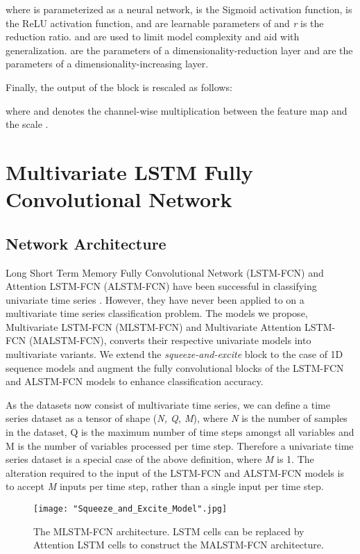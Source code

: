 \documentclass[preprint,12pt,3p]{elsarticle}
\begin{document}
where  is parameterized as a neural network,  is the Sigmoid activation function,  is the ReLU activation function,  and  are learnable parameters of  and \textit{r} is the reduction ratio.  and   are used to limit model complexity and aid with generalization.  are the parameters of a dimensionality-reduction layer and  are the parameters of a dimensionality-increasing layer. 

Finally, the output of the block is rescaled as follows:

where  and  denotes the channel-wise multiplication between the feature map  and the scale .



 
\section{Multivariate LSTM Fully Convolutional Network}
\label{LSTMFCN}
\subsection{Network Architecture}

Long Short Term Memory Fully Convolutional Network (LSTM-FCN) and Attention LSTM-FCN (ALSTM-FCN) have been successful in classifying univariate time series \cite{karim2017lstm}. However, they have never been applied to on a multivariate time series classification problem. The models we propose, Multivariate LSTM-FCN (MLSTM-FCN) and Multivariate Attention LSTM-FCN (MALSTM-FCN), converts their respective univariate models into multivariate variants. We extend the \textit{squeeze-and-excite} block to the case of 1D sequence models and augment the fully convolutional blocks of the LSTM-FCN and ALSTM-FCN models to enhance classification accuracy.

As the datasets now consist of multivariate time series, we can define a time series dataset as a tensor of shape (\textit{N, Q, M}), where \textit{N} is the number of samples in the dataset, Q is the maximum number of time steps amongst all variables and M is the number of variables processed per time step. Therefore a univariate time series dataset is a special case of the above definition, where \textit{M} is 1. The alteration required to the input of the LSTM-FCN and ALSTM-FCN models is to accept \textit{M} inputs per time step, rather than a single input per time step.

\begin{figure*}[htpb]
\center
\texttt{[image: "Squeeze\_and\_Excite\_Model".jpg]}

\center
\caption{The MLSTM-FCN architecture. LSTM cells can be replaced by Attention LSTM cells to construct the MALSTM-FCN architecture.}
\label{fig:arch}

\end{figure*}
\end{document}
